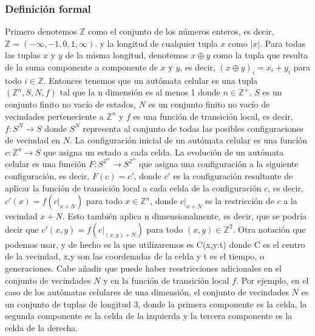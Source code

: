 \subsubsection{Definici\'on formal}
    \label{sec:AutomatasCelDefFormal}
    Primero denotemos $\mathbb{Z}$ como el conjunto de los n\'umeros enteros, es decir, $\mathbb{Z} = (-\infty,-1 ,0,1, \infty)$.
        y la longitud de cualquier tupla $x$ como $|x|$. Para todas las tuplas $x$ y $y$ de la misma longitud, denotemos $x \oplus y$
        como la tupla que resulta de la suma componente a componente de $x$ y $y$, es decir, $(x \oplus y)_i = x_i + y_i$ para todo 
        $i \in \mathbb{Z}$.
    \vskip 0.5cm
    Entonces tenemos que un aut\'omata celular es una tupla $({\mathbb{Z}^{n}},S,N,f)$ tal que la n dimensi\'on es al menos 1 donde 
        $n \in \mathbb{Z}^{+}$, $S$ es un conjunto finito no vac\'io de estados, $N$ es un conjunto finito no vac\'io de vecindades 
        perteneciente a ${\mathbb{Z}^{n}}$ y $f$ es una funci\'on de transici\'on local, es decir, $f: S^N \rightarrow S$ donde
        $S^N$ representa al conjunto de todas las posibles configuraciones de vecindad en $N$.
    \vskip 0.5cm
    La configuraci\'on inicial de un aut\'omata celular es una funci\'on $c: {\mathbb{Z}^{n}} \rightarrow S$ que asigna un estado a cada celda.
        La evoluci\'on de un aut\'omata celular es una funci\'on $F: S^{{\mathbb{Z}^{n}}} \rightarrow S^{{\mathbb{Z}^{n}}}$ que asigna una configuraci\'on a la siguiente
        configuraci\'on, es decir, $F(c) = c'$, donde $c'$ es la configuraci\'on resultante de aplicar la funci\'on de transici\'on local a cada
        celda de la configuraci\'on $c$, es decir, $c'(x) = f(c|_{x+N})$ para todo $x \in {\mathbb{Z}^{n}}$, donde $c|_{x+N}$ es la restricci\'on de $c$ a la vecindad $x+N$.
        Esto tambi\'en aplica n dimensionalmente, es decir, que se podr\'ia decir que $c'(x,y) = f(c|_{(x,y)+N})$ para todo $(x,y) \in {\mathbb{Z}^{2}}$.
        Otra notaci\'on que podemos usar, y de hecho es la que utilizaremos es C(x,y:t) donde C es el centro de la vecindad, x,y son las coordenadas de la celda y t es el tiempo,
        o generaciones.
    \vskip 0.5cm
    Cabe a\~nadir que puede haber reestricciones adicionales en el conjunto de vecindades $N$ y en la funci\'on de transici\'on local $f$.
        Por ejemplo, en el caso de los aut\'omatas celulares de una dimensi\'on, el conjunto de vecindades $N$ es un conjunto de tuplas de longitud 3,
        donde la primera componente es la celda, la segunda componente es la celda de la izquierda y la tercera componente es la celda de la derecha.
